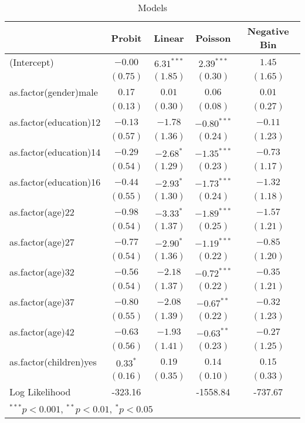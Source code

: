 
\begin{table}[hb!]
\tiny
\begin{center}
\begin{tabular}{l c c c c }
\toprule
 & Probit & Linear & Poisson & Negative Bin \\
\midrule
(Intercept)            & $-0.00$     & $6.31^{***}$ & $2.39^{***}$  & $1.45$   \\
                       & $(0.75)$    & $(1.85)$     & $(0.30)$      & $(1.65)$ \\
as.factor(gender)male  & $0.17$      & $0.01$       & $0.06$        & $0.01$   \\
                       & $(0.13)$    & $(0.30)$     & $(0.08)$      & $(0.27)$ \\
as.factor(education)12 & $-0.13$     & $-1.78$      & $-0.80^{***}$ & $-0.11$  \\
                       & $(0.57)$    & $(1.36)$     & $(0.24)$      & $(1.23)$ \\
as.factor(education)14 & $-0.29$     & $-2.68^{*}$  & $-1.35^{***}$ & $-0.73$  \\
                       & $(0.54)$    & $(1.29)$     & $(0.23)$      & $(1.17)$ \\
as.factor(education)16 & $-0.44$     & $-2.93^{*}$  & $-1.73^{***}$ & $-1.32$  \\
                       & $(0.55)$    & $(1.30)$     & $(0.24)$      & $(1.18)$ \\
as.factor(age)22       & $-0.98$     & $-3.33^{*}$  & $-1.89^{***}$ & $-1.57$  \\
                       & $(0.54)$    & $(1.37)$     & $(0.25)$      & $(1.21)$ \\
as.factor(age)27       & $-0.77$     & $-2.90^{*}$  & $-1.19^{***}$ & $-0.85$  \\
                       & $(0.54)$    & $(1.36)$     & $(0.22)$      & $(1.20)$ \\
as.factor(age)32       & $-0.56$     & $-2.18$      & $-0.72^{***}$ & $-0.35$  \\
                       & $(0.54)$    & $(1.37)$     & $(0.22)$      & $(1.21)$ \\
as.factor(age)37       & $-0.80$     & $-2.08$      & $-0.67^{**}$  & $-0.32$  \\
                       & $(0.55)$    & $(1.39)$     & $(0.22)$      & $(1.23)$ \\
as.factor(age)42       & $-0.63$     & $-1.93$      & $-0.63^{**}$  & $-0.27$  \\
                       & $(0.56)$    & $(1.41)$     & $(0.23)$      & $(1.25)$ \\
as.factor(children)yes & $0.33^{*}$  & $0.19$       & $0.14$        & $0.15$   \\
                       & $(0.16)$    & $(0.35)$     & $(0.10)$      & $(0.33)$ \\
\midrule
Log Likelihood         & -323.16     &              & -1558.84      & -737.67  \\
\bottomrule
\multicolumn{5}{l}{\scriptsize{$^{***}p<0.001$, $^{**}p<0.01$, $^*p<0.05$}}
\end{tabular}
\caption{Models}
\label{table:coefficients}
\end{center}
\end{table}
